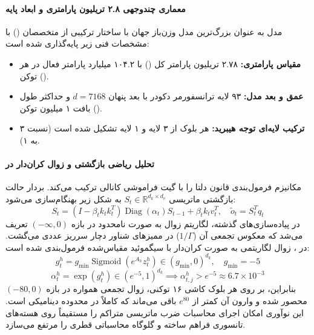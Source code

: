 \item {}

\paragraph*{معماری چندوجهی ۲.۸ تریلیون پارامتری و ابعاد پایه}
مدل  \cite{kimi_k3_2026} به عنوان بزرگ‌ترین مدل وزن‌باز جهان با ساختار ترکیبی از متخصصان () با مشخصات فنی زیر پایه‌گذاری شده است:
\begin{itemize}
    \item \textbf{مقیاس پارامتری:} ۲.۷۸ تریلیون پارامتر کل () با ۱۰۴.۲ میلیارد پارامتر فعال در هر توکن ().
    \item \textbf{عمق و بعد مدل:} ۹۳ لایه ترانسفورمر دکودر با بعد پنهان $d = 7168$ و حداکثر طول بافت ۱ میلیون توکن ().
    \item \textbf{ترکیب لایه‌ای توجه هیبرید:} هر بلوک از ۳ لایه  و ۱ لایه  تشکیل شده است (نسبت ۳ به ۱).
\end{itemize}

\paragraph*{تحلیل ریاضی بازگشتی و زوال کران‌دار در }
مکانیزم  فرمول‌بندی قانون دلتا را با گیت فراموشی کانالی ترکیب می‌کند. بردار حالت بازگشتی ماتریسی $S_t \in \mathbb{R}^{d_k \times d_v}$ به شکل زیر بهنگام‌سازی می‌شود:
\begin{equation}
    S_t = \left( I - \beta_t k_t k_t^T \right) \operatorname{Diag}(\alpha_t) S_{t-1} + \beta_t k_t v_t^T, \quad \tilde{o}_t = S_t^T q_t
\end{equation}
در پیاده‌سازی‌های گذشته، لگاریتم زوال به صورت نامحدود در بازه $(-\infty, 0)$ تعریف می‌شد که معکوس تجمعی آن ($1/\Gamma$) در ممیزهای شناور دچار سرریز عددی می‌گشت. در ، زوال لگاریتمی به صورت کران‌دار با سیگموئید مقیاس‌شده فرمول‌بندی شده است:
\begin{equation}
    g_t^h = g_{\min} \operatorname{Sigmoid}\left( e^{A_h} z_t^h \right) \in (g_{\min}, 0)^{d_k}, \quad g_{\min} = -5
\end{equation}
\begin{equation}
    \alpha_t^h = \exp(g_t^h) \in \left( e^{-5}, 1 \right)^{d_k} \implies \alpha_{t, j}^h > e^{-5} \approx 6.7 \times 10^{-3}
\end{equation}
بنابراین، بر روی هر بلوک کاشی ۱۶ توکنی، زوال تجمعی همواره در بازه $(-80, 0)$ محصور شده و وارون آن کمتر از $e^{80}$ باقی می‌ماند که کاملاً در محدوده دینامیکی  است. این نوآوری امکان اجرای محاسبات ضرب ماتریسی متراکم را مستقیماً روی هسته‌های تانسوری فراهم ساخته و گلوگاه محاسباتی قطری را مرتفع می‌سازد.


